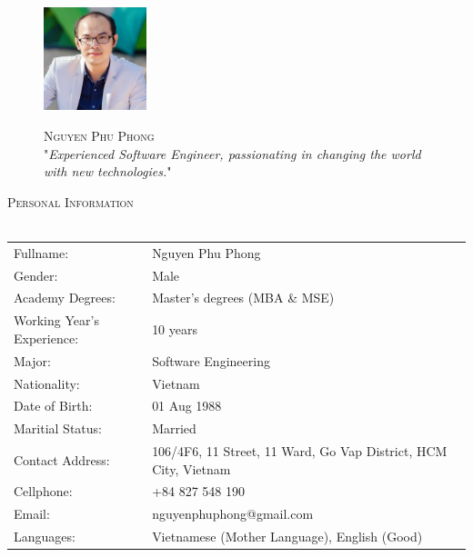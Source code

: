\documentclass[a4paper]{article}
\newcommand{\lineunder} {
    \vspace*{-8pt} \\
    \hspace*{-18pt} \hrulefill \\
}
\newcommand{\header} [1] {
    {\hspace*{-18pt}\vspace*{6pt} \textsc{#1}}
    \vspace*{-6pt} \lineunder
}
\begin{document}
\vspace*{-40pt}

    

\vspace*{-10pt}
\begin{figure}[htp]
	\begin{minipage}{.3\textwidth}
		\includegraphics[width=3cm, frame=.2em]{Avatar.JPG}
	\end{minipage}
	\begin{minipage}{.7\textwidth}
		\begin{center}
			{\Huge \scshape {Nguyen Phu Phong}}\\
			"\textit{Experienced Software Engineer, passionating in changing the world with new technologies.}" \\
		\end{center}
	\end{minipage}
\end{figure}

\header{Personal Information}
\begin{tabular}{ l l }
	Fullname:                    & Nguyen Phu Phong \\
	Gender:                     & Male \\
	Academy Degrees: 			& Master's degrees (MBA \& MSE) \\
	Working Year's Experience: & 10 years \\
	Major: & Software Engineering \\
	Nationality:               & Vietnam \\
	Date of Birth:                       & 01 Aug 1988 \\
	Maritial Status:                     & Married                                              \\
	Contact Address:                    & 106/4F6, 11 Street, 11 Ward, Go Vap District, HCM City, Vietnam \\
	Cellphone:                         & +84 827 548 190 \\
	Email:			& nguyenphuphong@gmail.com \\
	Languages: & Vietnamese (Mother Language), English (Good)
\end{tabular}
\vspace{2mm}
\end{document}

